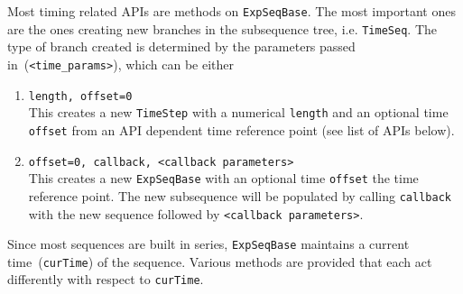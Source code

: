 Most timing related APIs are methods on \lstinline{ExpSeqBase}.
The most important ones are the ones creating new branches
in the subsequence tree, i.e. \lstinline{TimeSeq}.
The type of branch created is determined by the parameters passed in~(\lstinline{<time_params>}),
which can be either
\begin{enumerate}
\item \lstinline{length, offset=0}\\
  This creates a new \lstinline{TimeStep} with a numerical \lstinline{length}
  and an optional time \lstinline{offset} from an API dependent time reference point
  (see list of APIs below).
\item \lstinline{offset=0, callback, <callback parameters>}\\
  This creates a new \lstinline{ExpSeqBase} with an optional time \lstinline{offset}
  the time reference point.
  The new subsequence will be populated by calling \lstinline{callback}
  with the new sequence followed by \lstinline{<callback parameters>}.
\end{enumerate}
Since most sequences are built in series, \lstinline{ExpSeqBase} maintains
a current time~(\lstinline{curTime}) of the sequence.
Various methods are provided that each act differently with respect to \lstinline{curTime}.
